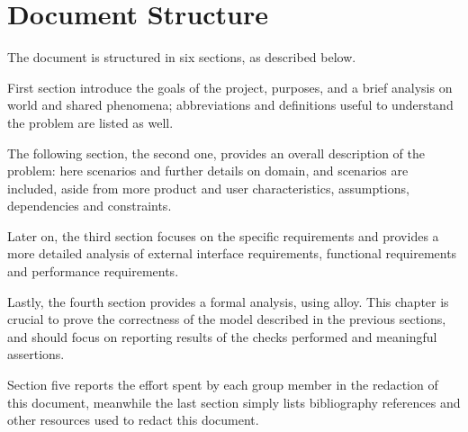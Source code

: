 \section{Document Structure}
\label{sec:document_structure}
The document is structured in six sections, as described below.

First section introduce the goals of the project, purposes, and a brief analysis on world and shared phenomena;
abbreviations and definitions useful to understand the problem are listed as well.

The following section, the second one, provides an overall description of the problem: here scenarios and further
details on domain, and scenarios are included, aside from more product and user characteristics, assumptions,
dependencies and constraints.

Later on, the third section focuses on the specific requirements and provides a more detailed analysis of external
interface requirements, functional requirements and performance requirements.

Lastly, the fourth section provides a formal analysis, using alloy.
This chapter is crucial to prove the correctness of the model described in the previous sections, and should focus on
reporting results of the checks performed and meaningful assertions.

Section five reports the effort spent by each group member in the redaction of this document, meanwhile the last
section simply lists bibliography references and other resources used to redact this document.
